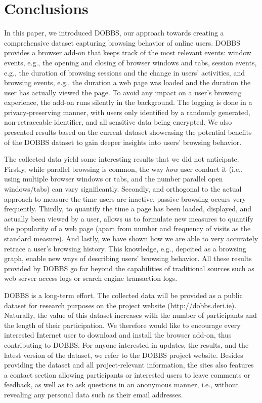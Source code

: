 \documentclass[11pt,fleqn,twoside]{article}
\begin{document}
\section{Conclusions}
\label{sec:conclusions}
In this paper, we introduced DOBBS, our approach towards creating a comprehensive dataset capturing browsing behavior of online users. DOBBS provides a browser add-on that keeps track of the most relevant events: window events, e.g., the opening and closing of browser windows and tabs, session events, e.g., the duration of browsing sessions and the change in users' activities, and browsing events, e.g., the duration a web page was loaded and the duration the user has actually viewed the page. To avoid any impact on a user's browsing experience, the add-on runs silently in the background. The logging is done in a privacy-preserving manner, with users only identified by a randomly generated, non-retraceable identifier, and all sensitive data being encrypted. We also presented results based on the current dataset showcasing the potential benefits of the DOBBS dataset to gain deeper insights into users' browsing behavior.

The collected data yield some interesting results that we did not anticipate. Firstly, while parallel browsing is common, the way \textit{how} user conduct it (i.e., using multiple browser windows or tabs, and the number parallel open windows/tabs) can vary significantly. Secondly, and orthogonal to the actual approach to measure the time users are inactive, passive browsing occurs very frequently. Thirdly, to quantify the time a page has been loaded, displayed, and actually been viewed by a user, allows us to formulate new measures to quantify the popularity of a web page (apart from number and frequency of visits as the standard measure). And lastly, we have shown how we are able to very accurately retrace a user's browsing history. This knowledge, e.g., depcited as a browsing graph, enable new ways of describing users' browsing behavior. All these results provided by DOBBS go far beyond the capabilities of traditional sources such as web server access logs or search engine transaction logs.

DOBBS is a long-term effort. The collected data will be provided as a public dataset for research purposes on the project website (http://dobbs.deri.ie). Naturally, the value of this dataset increases with the number of participants and the length of their participation. We therefore would like to encourage every interested Internet user to download and install the browser add-on, thus contributing to DOBBS. For anyone interested in updates, the results, and the latest version of the dataset, we refer to the DOBBS project website. Besides providing the dataset and all project-relevant information, the sites also features a contact section allowing participants or interested users to leave comments or feedback, as well as to ask questions in an anonymous manner, i.e., without revealing any personal data such as their email addresses.


\vspace{-0.3cm}
\renewcommand{\baselinestretch}{0.97}


\end{document}
